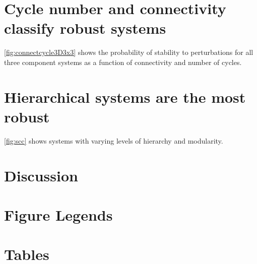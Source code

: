 \section{Cycle number and connectivity classify robust systems}
\ref{fig:connectcycle3D3x3} shows the probability of stability to perturbations for all three component systems as a function of connectivity and number of cycles.

\section{Hierarchical systems are the most robust}
\ref{fig:scc} shows systems with varying levels of hierarchy and modularity.

\section{Discussion}

\newpage




\newpage
\FloatBarrier

\section{Figure Legends}


\newpage
\FloatBarrier

\section{Tables}




% 



